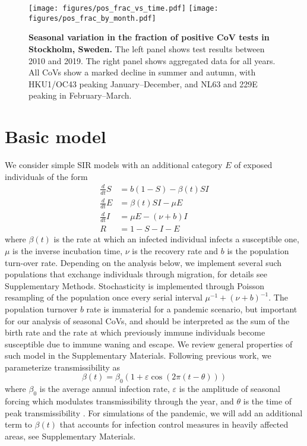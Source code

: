 \documentclass[rmp, reprint, superscriptaddress, floatfix,amsmath]{revtex4-1}
\newcommand{\Jan}[1]{{\color{deepsaffron}Jan: #1}}
\newcommand{\Emma}[1]{{\color{purple}Emma: #1}}
\newcommand{\forcing}{\varepsilon}
\begin{document}
\begin{figure*}
    \centering
    \texttt{[image: figures/pos\_frac\_vs\_time.pdf]}
    \texttt{[image: figures/pos\_frac\_by\_month.pdf]}
    \caption{{\bf Seasonal variation in the fraction of positive CoV tests in Stockholm, Sweden.} The left panel shows test results between 2010 and 2019. The right panel shows aggregated data for all years. All CoVs show a marked decline in summer and autumn, with HKU1/OC43 peaking January--December, and NL63 and 229E peaking in February--March. %
    }
    \label{fig:seasonal_CoV}
\end{figure*}

\section{Basic model}
We consider simple SIR models \citep{kermack_contributions_1991} with an additional category $E$ of exposed individuals of the form 
\begin{equation}
\begin{split}
\frac{d}{dt} S & = b(1-S) - \beta(t) S I \\
\frac{d}{dt} E & = \beta(t) S I - \mu E\\
\frac{d}{dt} I & = \mu E - (\nu+b) I \\
R & = 1-S-I-E
\end{split}
\label{eq:SIR}
\end{equation}
where $\beta(t)$ is the rate at which an infected individual infects a susceptible one, $\mu$ is the inverse incubation time, $\nu$ is the recovery rate and $b$ is the population turn-over rate. 
Depending on the analysis below, we implement several such populations that exchange individuals through migration, for details see Supplementary Methods. 
Stochasticity is implemented through Poisson resampling of the population once every serial interval $\mu^{-1}+(\nu+b)^{-1}$.
The population turnover $b$ rate is immaterial for a pandemic scenario, but important for our analysis of seasonal CoVs, and should be interpreted as the sum of the birth rate and the rate at which previously immune individuals become susceptible due to immune waning and escape.
We review general properties of such model in the Supplementary Materials. 
Following previous work, we parameterize transmissibility as 
\begin{equation}
\beta(t) = \beta_0\left(1+\forcing\cos(2\pi (t-\theta))\right)
\label{eq:transmissibility}
\end{equation}
where $\beta_0$ is the average annual infection rate, $\forcing$ is the amplitude of seasonal forcing which modulates transmissibility through the year, and $\theta$ is the time of peak transmissibility \citep{dushoff_dynamical_2004,chen_regular_2017}.
For simulations of the pandemic, we will add an additional term to $\beta(t)$ that accounts for infection control measures in heavily affected areas, see Supplementary Materials.
\end{document}
